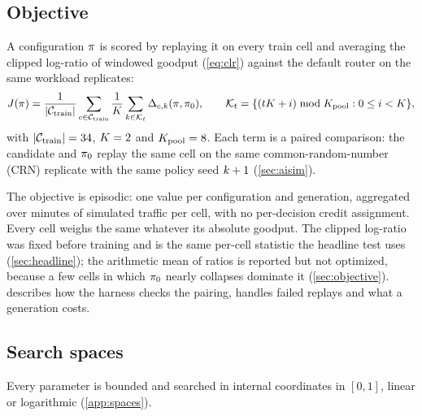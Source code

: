 \subsection{Objective}
\label{sec:train-objective}

A configuration $\pi$ is scored by replaying it on every train cell and averaging the clipped
log-ratio of windowed goodput (\cref{eq:clr}) against the default router on the same workload
replicates:
\begin{equation}
  \label{eq:objective}
  J(\pi) = \frac{1}{|\mathcal{C}_{\mathrm{train}}|}\sum_{c \in \mathcal{C}_{\mathrm{train}}}
    \frac{1}{K}\sum_{k \in \mathcal{K}_{t}} \Delta_{c,k}(\pi,\pi_{0}),
  \qquad
  \mathcal{K}_{t} = \{(tK + i) \bmod K_{\mathrm{pool}} : 0 \le i < K\},
\end{equation}
with $|\mathcal{C}_{\mathrm{train}}| = 34$, $K = 2$ and $K_{\mathrm{pool}} = 8$. Each term is a paired comparison: the
candidate and $\pi_{0}$ replay the same cell on the same common-random-number (CRN) replicate with
the same policy seed $k+1$ (\cref{sec:aisim}).

The objective is episodic: one value per configuration and generation, aggregated over minutes of
simulated traffic per cell, with no per-decision credit assignment. Every cell weighs the same
whatever its absolute goodput. The clipped log-ratio was fixed before training and is the same
per-cell statistic the headline test uses (\cref{sec:headline}); the arithmetic mean of ratios is
reported but not optimized, because a few cells in which $\pi_{0}$ nearly collapses dominate it
(\cref{sec:objective}).  describes how the harness checks the pairing, handles
failed replays and what a generation costs.

\subsection{Search spaces}
\label{sec:space}

Every parameter is bounded and searched in internal coordinates in $[0,1]$, linear or
logarithmic (\cref{app:spaces}).

